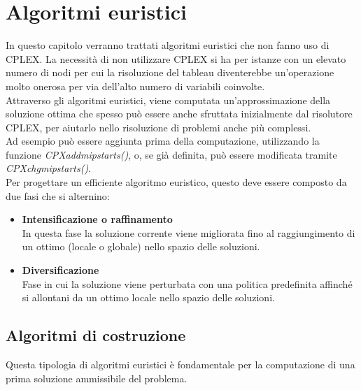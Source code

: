\chapter{Algoritmi euristici}\label{HEURISTIC}
In questo capitolo verranno trattati algoritmi euristici che non fanno uso di CPLEX. La necessità di non utilizzare CPLEX si ha per istanze con un elevato numero di nodi per cui la risoluzione del tableau diventerebbe un'operazione molto onerosa per via dell'alto numero di variabili coinvolte.\\
Attraverso gli algoritmi euristici, viene computata un'approssimazione della soluzione ottima che spesso può essere anche sfruttata inizialmente dal risolutore CPLEX, per aiutarlo nello risoluzione di problemi anche più complessi.\\
Ad esempio può essere aggiunta prima della computazione, utilizzando la funzione \textit{CPXaddmipstarts()}, o, se già definita, può essere modificata tramite \textit{CPXchgmipstarts()}.\\
Per progettare un efficiente algoritmo euristico, questo deve essere composto da due fasi che si alternino:
\begin{itemize}
\item{\textbf{Intensificazione o raffinamento}\\
In questa fase la soluzione corrente viene migliorata fino al raggiungimento di un ottimo (locale o globale) nello spazio delle soluzioni.
}
\item{\textbf{Diversificazione}\\
Fase in cui la soluzione viene perturbata con una politica predefinita affinché si allontani da un ottimo locale nello spazio delle soluzioni.
}
\end{itemize}


\section{Algoritmi di costruzione}\label{construction_alg}
Questa tipologia di algoritmi euristici è fondamentale per la computazione di una prima soluzione ammissibile del problema.
